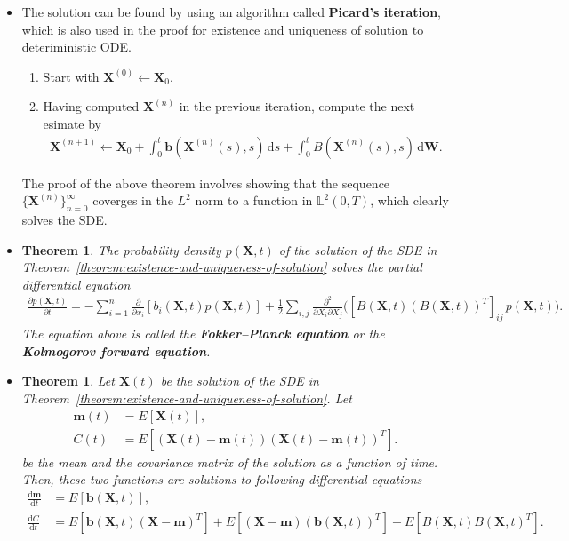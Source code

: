 \documentclass[10pt]{article}
\newtheorem{theorem}[lemma]{Theorem}
\newcommand{\dee}{\mathrm{d}}
\newcommand{\ve}[1]{\mathbf{#1}}
\begin{document}
\begin{itemize}
  \item The solution can be found by using an algorithm called {\bf Picard's iteration}, which is also used in the proof for existence and uniqueness of solution to deteriministic ODE.
  \begin{enumerate}
    \item Start with $\ve{X}^{(0)} \gets \ve{X}_0$.
    \item Having computed $\ve{X}^{(n)}$ in the previous iteration, compute the next esimate by
    \begin{align*}
      \ve{X}^{(n+1)} \gets \ve{X}_0 + \int_{0}^t \ve{b}(\ve{X}^{(n)}(s), s)\, \dee s + \int_0^t B(\ve{X}^{(n)}(s), s)\, \dee\ve{W}.
    \end{align*}
  \end{enumerate}
  The proof of the above theorem involves showing that the sequence $\{ \ve{X}^{(n)} \}_{n=0}^\infty$ coverges in the $L^2$ norm to a function in $\mathbb{L}^2(0,T)$, which clearly solves the SDE.

  \item \begin{theorem}
    The probability density $p(\ve{X},t)$ of the solution of the SDE in Theorem~\ref{theorem:existence-and-uniqueness-of-solution} solves the partial differential equation
    \begin{align*}
      \frac{\partial p(\ve{X},t)}{\partial t}
      = - \sum_{i=1}^n \frac{\partial }{\partial x_i} [ b_i(\ve{X}, t) p(\ve{X},t) ] + \frac{1}{2} \sum_{i,j} \frac{\partial^2}{\partial X_i \partial X_j} \bigg( [B(\ve{X},t) (B(\ve{X},t))^T]_{ij}\, p(\ve{X}, t) \bigg).
    \end{align*}
    The equation above is called the {\bf Fokker--Planck equation} or the {\bf Kolmogorov forward equation}.
  \end{theorem}

  \item \begin{theorem}
    Let $\ve{X}(t)$ be the solution of the SDE in Theorem~\ref{theorem:existence-and-uniqueness-of-solution}. Let 
    \begin{align*}
      \ve{m}(t) &= E[\ve{X}(t)], \\
      C(t) &= E[(\ve{X}(t) - \ve{m}(t))(\ve{X}(t) - \ve{m}(t))^T].
    \end{align*}
    be the mean and the covariance matrix of the solution as a function of time. Then, these two functions are solutions to following differential equations
    \begin{align*}
      \frac{\dee\ve{m}}{\dee t} &= E[\ve{b}(\ve{X},t)], \\
      \frac{\dee C}{\dee t}
      &= E[\ve{b}(\ve{X},t)(\ve{X} - \ve{m})^T] + E[(\ve{X} - \ve{m})(\ve{b}(\ve{X},t))^T] + E[B(\ve{X},t)B(\ve{X},t)^T].
    \end{align*}
  \end{theorem}
\end{itemize}
\end{document}
